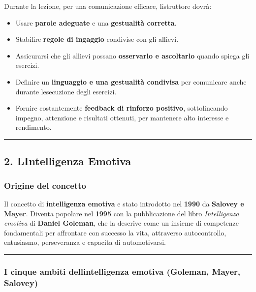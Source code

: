 \documentclass[a4paper,11pt]{article}
\providecommand{\tightlist}{%
  \setlength{\itemsep}{0pt}\setlength{\parskip}{0pt}}
\begin{document}
Durante la lezione, per una comunicazione efficace,
l\textquotesingle istruttore dovrà:

\begin{itemize}
      \tightlist
      \item
            Usare \textbf{parole adeguate} e una \textbf{gestualità corretta}.
      \item
            Stabilire \textbf{regole di ingaggio} condivise con gli allievi.
      \item
            Assicurarsi che gli allievi possano \textbf{osservarlo e ascoltarlo}
            quando spiega gli esercizi.
      \item
            Definire un \textbf{linguaggio e una gestualità condivisa} per
            comunicare anche durante l\textquotesingle esecuzione degli esercizi.
      \item
            Fornire costantemente \textbf{feedback di rinforzo positivo},
            sottolineando impegno, attenzione e risultati ottenuti, per mantenere
            alto interesse e rendimento.
\end{itemize}

\begin{center}\rule{0.5\linewidth}{0.5pt}\end{center}

\subsection{2. L\textquotesingle Intelligenza
      Emotiva}\label{lintelligenza-emotiva}

\subsubsection{Origine del concetto}\label{origine-del-concetto}

Il concetto di \textbf{intelligenza emotiva} e stato introdotto nel
\textbf{1990} da \textbf{Salovey e Mayer}. Diventa popolare nel
\textbf{1995} con la pubblicazione del libro \emph{Intelligenza emotiva}
di \textbf{Daniel Goleman}, che la descrive come un insieme di
competenze fondamentali per affrontare con successo la vita, attraverso
autocontrollo, entusiasmo, perseveranza e capacita di automotivarsi.

\begin{center}\rule{0.5\linewidth}{0.5pt}\end{center}

\subsubsection{I cinque ambiti dell\textquotesingle intelligenza emotiva
      (Goleman, Mayer,
      Salovey)}\label{i-cinque-ambiti-dellintelligenza-emotiva-goleman-mayer-salovey}
\end{document}
